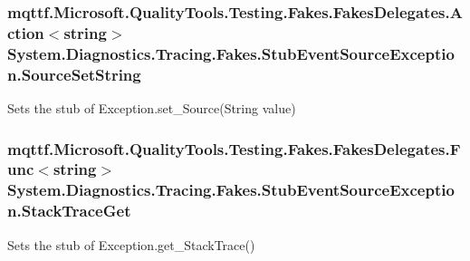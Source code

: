 \hypertarget{class_system_1_1_diagnostics_1_1_tracing_1_1_fakes_1_1_stub_event_source_exception_a3940197549955bb986bd6248fc512304}{
\subsubsection[{Source\-Set\-String}]{\setlength{\rightskip}{0pt plus 5cm}mqttf.\-Microsoft.\-Quality\-Tools.\-Testing.\-Fakes.\-Fakes\-Delegates.\-Action$<$string$>$ System.\-Diagnostics.\-Tracing.\-Fakes.\-Stub\-Event\-Source\-Exception.\-Source\-Set\-String}}\label{class_system_1_1_diagnostics_1_1_tracing_1_1_fakes_1_1_stub_event_source_exception_a3940197549955bb986bd6248fc512304}


Sets the stub of Exception.\-set\-\_\-\-Source(\-String value)

\hypertarget{class_system_1_1_diagnostics_1_1_tracing_1_1_fakes_1_1_stub_event_source_exception_a56be0cac7242985cd9789983c5980a99}{
\subsubsection[{Stack\-Trace\-Get}]{\setlength{\rightskip}{0pt plus 5cm}mqttf.\-Microsoft.\-Quality\-Tools.\-Testing.\-Fakes.\-Fakes\-Delegates.\-Func$<$string$>$ System.\-Diagnostics.\-Tracing.\-Fakes.\-Stub\-Event\-Source\-Exception.\-Stack\-Trace\-Get}}\label{class_system_1_1_diagnostics_1_1_tracing_1_1_fakes_1_1_stub_event_source_exception_a56be0cac7242985cd9789983c5980a99}


Sets the stub of Exception.\-get\-\_\-\-Stack\-Trace()

